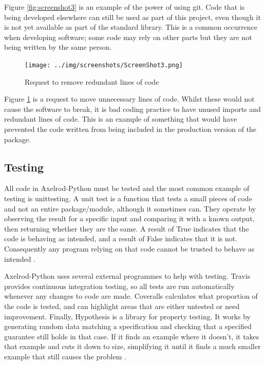 Figure \ref{fig:screenshot3} is an example of the power of using git.
Code that is being developed elsewhere can still be used as part of this project, even though it is not yet available as part of the standard library.
This is a common occurrence when developing software; some code may rely on other parts but they are not being written by the same person.

\begin{figure}[htbp!]
\texttt{[image: ../img/screenshots/ScreenShot3.png]}
\caption{Request to remove redundant lines of code}
\label{fig:screenshot4}
\end{figure}

Figure \ref{fig:screenshot4} is a request to move unnecessary lines of code.
Whilst these would not cause the software to break, it is bad coding practice to have unused imports and redundant lines of code.
This is an example of something that would have prevented the code written from being included in the production version of the package.

\subsection{Testing}
All code in Axelrod-Python must be tested and the most common example of testing is unittesting.
A unit test is a function that tests a small pieces of code and not an entire package/module, although it sometimes can.
They operate by observing the result for a specific input and comparing it with a known output, then returning whether they are the same.
A result of True indicates that the code is behaving as intended, and a result of False indicates that it is not.
Consequently any program relying on that code cannot be trusted to behave as intended \cite{Sarma2016, Williams}.

Axelrod-Python uses several external programmes to help with testing.
Travis \cite{Travis} provides continuous integration testing, so all tests are run automatically whenever any changes to code are made.
Coveralls \cite{Coveralls} calculates what proportion of the code is tested, and can highlight areas that are either untested or need improvement.
Finally, Hypothesis \cite{Hypothesis3.6.1} is a library for property testing.
It works by generating random data matching a specification and checking that a specified guarantee still holds in that case.
If it finds an example where it doesn’t, it takes that example and cuts it down to size, simplifying it until it finds a much smaller example that still causes the problem \cite{HypothesisDocs}.

